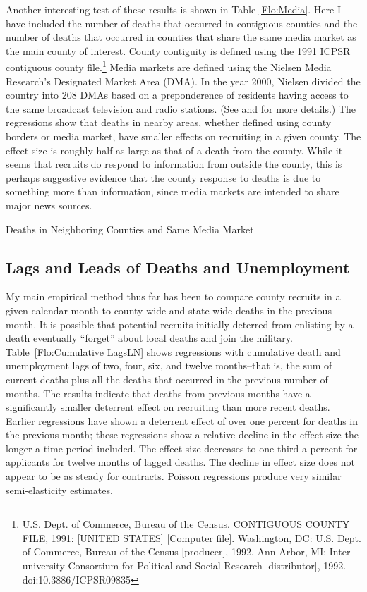 \documentclass[12pt] {article}
\begin{document}
Another interesting test of these results is shown in Table \ref{Flo:Media}.
Here I have included the number of deaths that occurred in contiguous
counties and the number of deaths that occurred in counties that share
the same media market as the main county of interest. County contiguity
is defined using the 1991 ICPSR contiguous county file.\footnote{U.S. Dept. of Commerce, Bureau of the Census. CONTIGUOUS COUNTY FILE,
1991: {[}UNITED STATES{]} {[}Computer file{]}. Washington, DC: U.S.
Dept. of Commerce, Bureau of the Census {[}producer{]}, 1992. Ann
Arbor, MI: Inter- university Consortium for Political and Social Research
{[}distributor{]}, 1992. doi:10.3886/ICPSR09835 
} Media markets are defined using the Nielsen Media Research's Designated
Market Area (DMA). In the year 2000, Nielsen divided the country into 208 DMAs based on a preponderence of residents having access to the same broadcast television and radio stations.   (See \cite{DMAsource1} and \cite{DMAsource2} for more details.) The regressions show that deaths in nearby areas, whether defined using county borders or media market, have smaller effects on recruiting in a given county. The effect size is roughly half as large as that of a death from the county. While it seems that recruits do respond to information from outside the county, this is perhaps suggestive evidence that the county response to deaths is due to something more than information, since media markets are intended to share major news sources. 

\begin{table}
\caption{Deaths in Neighboring Counties and Same Media Market}
\label{Flo:Media}
\scalebox{0.65}{
}
\end{table}

\subsection{Lags and Leads of Deaths and Unemployment\label{sub:Lags}}
My main empirical method thus far has been to compare county recruits
in a given calendar month to county-wide and state-wide deaths in
the previous month. It is possible that potential recruits initially
deterred from enlisting by a death eventually {}``forget'' about
local deaths and join the military. Table~\ref{Flo:Cumulative LagsLN}
shows regressions with cumulative death and unemployment lags
of two, four, six, and twelve months--that is, the sum of current
deaths plus all the deaths that occurred in the previous number of
months. The results indicate that deaths from previous months have a significantly smaller deterrent effect on recruiting than more recent deaths. Earlier regressions have shown a deterrent effect of over one percent for deaths in the previous month; these
regressions show a relative decline in the effect size the longer a time period included. The effect size decreases to one third a percent for applicants for twelve months of lagged deaths. The decline in effect size does not appear to be as steady for contracts. Poisson regressions produce very similar semi-elasticity
estimates.
\end{document}
